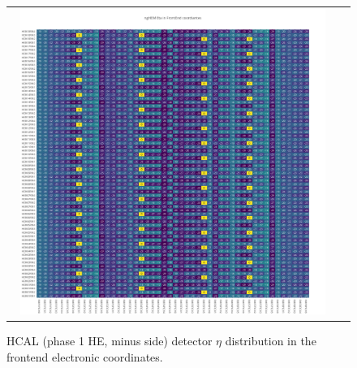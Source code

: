 \clearpage
\begin{figure}[htb]
 \begin{center}
  \begin{tabular}{cc}
   \includegraphics[angle=0,width=0.95\textwidth]{figures/appendix/ngHEM_Eta_in_FrontEnd.png}
  \end{tabular}
  \caption{HCAL (phase 1 HE, minus side) detector $\eta$ distribution in the frontend electronic coordinates.}
  \label{fig:lmapngHEMEtaFEC}
 \end{center}
\end{figure}

